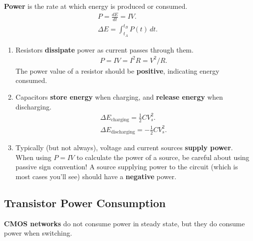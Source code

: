 \textbf{Power} is the rate at which energy is produced or consumed.
\begin{align*}
    P = \frac{dE}{dt} = IV. \\
    \Delta E = \int_{t_A}^{t_B} P(t) \, dt.
\end{align*}
\begin{enumerate}
    \item Resistors \textbf{dissipate} power as current passes through them.
    \begin{align*}
        P = IV = I^2R = V^2/R.
    \end{align*}
    The power value of a resistor should be \textbf{positive}, indicating energy consumed.

    \item Capacitors \textbf{store energy} when charging, and \textbf{release energy} when discharging.
    \begin{align*}
        \Delta E_{\text{charging}} = \frac{1}{2} CV_s^2. \\
        \Delta E_{\text{discharging}} = -\frac{1}{2} CV_s^2.
    \end{align*}

    \item Typically (but not always), voltage and current sources \textbf{supply power}. When using $P = IV$ to calculate the power of a source, be careful about using passive sign convention! A source supplying power to the circuit (which is most cases you'll see) should have a \textbf{negative} power.
\end{enumerate}

\subsection*{Transistor Power Consumption}

\textbf{CMOS networks} do not consume power in steady state, but they do consume power when switching.

